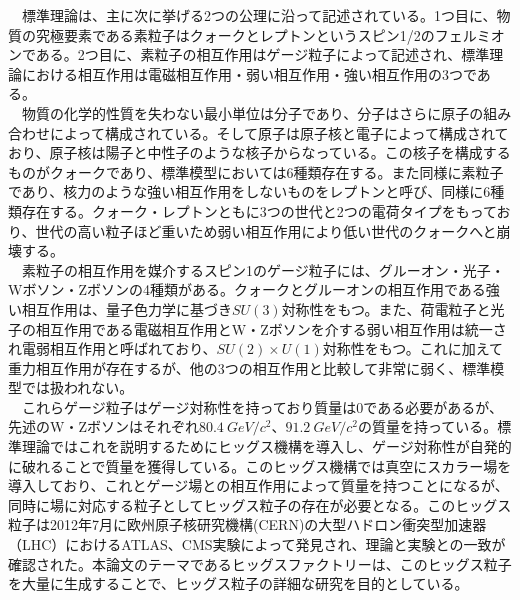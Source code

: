 　標準理論は、主に次に挙げる2つの公理に沿って記述されている。1つ目に、物質の究極要素である素粒子はクォークとレプトンというスピン1/2のフェルミオンである。2つ目に、素粒子の相互作用はゲージ粒子によって記述され、標準理論における相互作用は電磁相互作用・弱い相互作用・強い相互作用の3つである。\\
　物質の化学的性質を失わない最小単位は分子であり、分子はさらに原子の組み合わせによって構成されている。そして原子は原子核と電子によって構成されており、原子核は陽子と中性子のような核子からなっている。この核子を構成するものがクォークであり、標準模型においては6種類存在する。また同様に素粒子であり、核力のような強い相互作用をしないものをレプトンと呼び、同様に6種類存在する。クォーク・レプトンともに3つの世代と2つの電荷タイプをもっており、世代の高い粒子ほど重いため弱い相互作用により低い世代のクォークへと崩壊する。\\
　素粒子の相互作用を媒介するスピン1のゲージ粒子には、グルーオン・光子・Wボソン・Zボソンの4種類がある。クォークとグルーオンの相互作用である強い相互作用は、量子色力学に基づき$SU(3)$対称性をもつ。また、荷電粒子と光子の相互作用である電磁相互作用とW・Zボソンを介する弱い相互作用は統一され電弱相互作用と呼ばれており、$SU(2)\times U(1)$対称性をもつ。これに加えて重力相互作用が存在するが、他の3つの相互作用と比較して非常に弱く、標準模型では扱われない。\\
　これらゲージ粒子はゲージ対称性を持っており質量は0である必要があるが、先述のW・Zボソンはそれぞれ$80.4\ GeV/c^2$、$91.2\ GeV/c^2$の質量を持っている。標準理論ではこれを説明するためにヒッグス機構を導入し、ゲージ対称性が自発的に破れることで質量を獲得している。このヒッグス機構では真空にスカラー場を導入しており、これとゲージ場との相互作用によって質量を持つことになるが、同時に場に対応する粒子としてヒッグス粒子の存在が必要となる。このヒッグス粒子は2012年7月に欧州原子核研究機構(CERN)の大型ハドロン衝突型加速器（LHC）におけるATLAS、CMS実験によって発見され、理論と実験との一致が確認された。本論文のテーマであるヒッグスファクトリーは、このヒッグス粒子を大量に生成することで、ヒッグス粒子の詳細な研究を目的としている。\\
